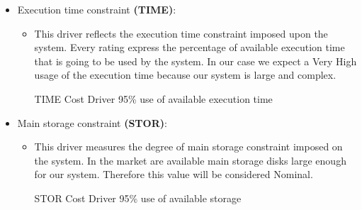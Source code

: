 \begin{itemize}
	\item Execution time constraint \textbf{(TIME)}: 
	\begin{itemize}
	\item[] This driver reflects the execution time constraint imposed upon the system. Every rating express the percentage of available execution time that is going to be used by the system. In our case we expect a \textsf{Very High} usage of the execution time because our system is large and complex.
	\begin{costdriverstable}{TIME Cost Driver}
		 {95\% use of available execution time}\hline
	\end{costdriverstable}
	\end{itemize}
\end{itemize}
\newpage
\begin{itemize}
	\item Main storage constraint \textbf{(STOR)}: 
	\begin{itemize}
	\item[] This driver measures the degree of main storage constraint imposed on the system. In the market are available main storage disks large enough for our system. Therefore this value will be considered \textsf{Nominal}.
	\begin{costdriverstable}{STOR Cost Driver}
		 {95\% use of available storage}\hline
	\end{costdriverstable}
	\end{itemize}
\end{itemize}

